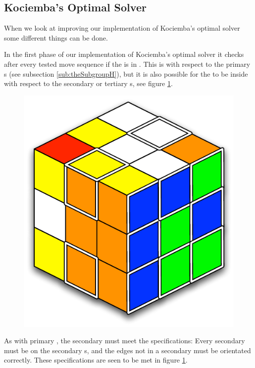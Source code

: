 \subsection{Kociemba's Optimal Solver}
When we look at improving our implementation of Kociemba's optimal solver some different things can be done.
	
In the first phase of our implementation of Kociemba's optimal solver it checks after every tested move sequence if the \cube{} is in .
This  is with respect to the primary \face{}s (see subsection \ref{sub:theSubgroupH}), but it is also possible for the \rubik{} to be inside  with respect to the secondary or tertiary \face{}s, see figure \ref{fig:secondaryH}.

\begin{figure}[htb]
	\centering
	\includegraphics[scale=0.75]{input/pics/secondaryH.pdf}
	\caption{}
	\label{fig:secondaryH}
\end{figure}

As with primary , the secondary  must meet the specifications:
Every secondary \facelet{} must be on the secondary \face{}s, and the edges not in a secondary \face{} must be orientated correctly.
These specifications are seen to be met in figure \ref{fig:secondaryH}.

